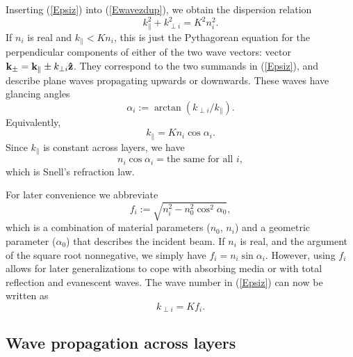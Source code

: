 Inserting (\ref{Epsiz}) into (\ref{Ewavezdup}),
we obtain the dispersion relation
\begin{equation}\label{Edisp}
  k_\parallel^2 + k_{\perp i}^2 = K^2 n_i^2.   
\end{equation}
If $n_i$ is real and $k_\parallel<K n_i$,
this is just the Pythagorean equation
for the perpendicular components of either of
the two wave vectors:
vector $\mathbf{k}_\pm=\mathbf{k}_\parallel \pm k_{\perp i}\mathbf{\hat z}$.
They correspond to the two summands in (\ref{Epsiz}),
and describe plane waves propagating upwards or downwards.
These waves have glancing angles
\begin{equation}\label{Edef_alpha}
  \alpha_i:=\arctan(k_{\perp i}/k_\parallel).  
\end{equation}
Equivalently,
\begin{equation}
  k_\parallel=K n_i \cos\alpha_i. 
\end{equation}
Since $k_\parallel$ is constant across layers,
we have
\begin{equation}\label{ESnell}
  n_i \cos\alpha_i = \text{the same for all }i,
\end{equation}
which is Snell's refraction law.

For later convenience we abbreviate
\begin{equation}\label{Edef_f}
f_i := \sqrt{ n_i^2 - n_0^2 \cos^2\alpha_0 },
\end{equation}
which is a combination of material parameters ($n_0$, $n_i$)
and a geometric parameter ($\alpha_0$) that describes the incident beam.
If $n_i$ is real, and the argument of the square root nonnegative,
we simply have $f_i=n_i\sin\alpha_i$.
However, using $f_i$ allows for later generalizations
to cope with absorbing media or with total reflection and evanescent waves.
The wave number in (\ref{Epsiz}) can now be written as
\begin{equation}\label{EkKf}
  k_{\perp i} = K f_i.
\end{equation}


\subsection{Wave propagation across layers}

